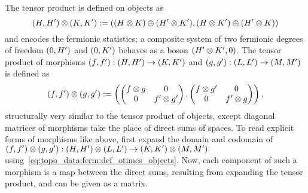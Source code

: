 The tensor product is defined on objects as
\begin{equation}
    \label{eq:topo_data:ferm:def_otimes_objects}
    \fermpair{H}{H'} \otimes \fermpair{K}{K'}
    := \fermpair{(H \otimes K) \oplus (H' \otimes K')}{(H \otimes K') \oplus (H' \otimes K)}
\end{equation}
and encodes the fermionic statistics; a composite system of two fermionic degrees of freedom $\fermpair{0}{H'}$ and $\fermpair{0}{K'}$ behaves as a boson $\fermpair{H' \otimes K'}{0}$.
%
The tensor product of morphisms $\fermpair{f}{f'} : \fermpair{H}{H'} \to \fermpair{K}{K'}$ and $\fermpair{g}{g'} : \fermpair{L}{L'} \to \fermpair{M}{M'}$ is defined as
\begin{equation}
    \fermpair{f}{f'} \otimes \fermpair{g}{g'}
    := \fermpair{ 
        \begin{pmatrix} f \otimes g & 0 \\ 0 & f' \otimes g' \end{pmatrix}
    }{
        \begin{pmatrix} f \otimes g' & 0 \\ 0 & f' \otimes g \end{pmatrix}
    }
    ,
\end{equation}
structurally very similar to the tensor product of objects, except diagonal matrices of morphisms take the place of direct sums of spaces.
%
To read explicit forms of morphisms like above, first expand the domain and codomain
of $\fermpair{f}{f'} \otimes \fermpair{g}{g'} : \fermpair{H}{H'} \otimes \fermpair{L}{L'} \to \fermpair{K}{K'} \otimes \fermpair{M}{M'}$ using~\eqref{eq:topo_data:ferm:def_otimes_objects}.
%
Now, each component of such a morphism is a map between the direct sums, resulting from expanding the tensor product, and can be given as a matrix.

